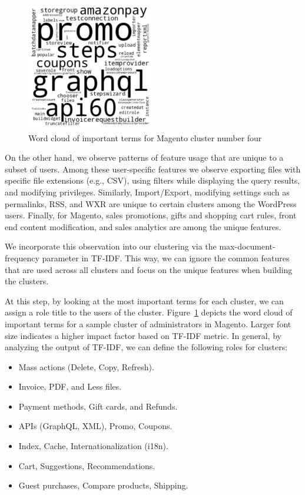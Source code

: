 \begin{figure}[t]
    \centering
    \includegraphics[width=0.5\textwidth]{figures/dbltr/magento_wordcloud.pdf}
    \caption{Word cloud of important terms for Magento cluster number four}
    \label{fig:magento_wordcloud}
\end{figure}

On the other hand, we observe patterns of feature usage that are unique to a subset of users. 
Among these user-specific features we observe exporting files with specific file extensions (e.g., CSV), using filters while displaying the query results, and modifying privileges. 
Similarly, Import/Export, modifying settings such as permalinks, RSS, and WXR are unique to certain clusters among the WordPress users. 
Finally, for Magento, sales promotions, gifts and shopping cart rules, front end content modification, and sales analytics are among the unique features. 

We incorporate this observation into our clustering via the max-document-frequency parameter in TF-IDF. 
This way, we can ignore the common features that are used across all clusters and focus on the unique features when building the clusters. 

At this step, by looking at the most important terms for each cluster, we can assign a role title to the users of the cluster. 
Figure~\ref{fig:magento_wordcloud} depicts the word cloud of important terms for a sample cluster of administrators in Magento. 
Larger font size indicates a higher impact factor based on TF-IDF metric. In general, by analyzing the output of TF-IDF, we can define the following roles for clusters:

\begin{itemize}
    \item Mass actions (Delete, Copy, Refresh).
    \item Invoice, PDF, and Less files.
    \item Payment methods, Gift cards, and Refunds.
    \item APIs (GraphQL, XML), Promo, Coupons.
    \item Index, Cache, Internationalization (i18n).
    \item Cart, Suggestions, Recommendations.
    \item Guest purchases, Compare products, Shipping.
\end{itemize}

